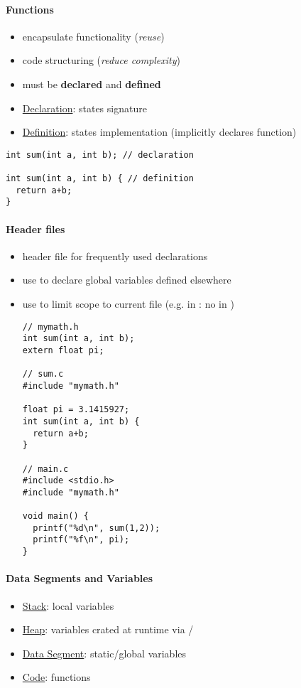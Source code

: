 \paragraph{Functions}
\begin{itemize}
  \item encapsulate functionality (\emph{reuse})
  \item code structuring (\emph{reduce complexity})
  \item must be \textbf{declared} and \textbf{defined}
  \item \underline{Declaration}: states signature
  \item \underline{Definition}: states implementation (implicitly declares function)
\end{itemize}
\begin{lstlisting}[style=customc]
int sum(int a, int b); // declaration

int sum(int a, int b) { // definition
  return a+b;
}
\end{lstlisting}

\paragraph{Header files}
\begin{itemize}
  \item header file for frequently used declarations
  \item use  to declare global variables defined elsewhere
  \item use  to limit scope to current file (e.g.  in : no  in )
  \begin{lstlisting}[style=customc]
// mymath.h
int sum(int a, int b);
extern float pi;

// sum.c
#include "mymath.h"

float pi = 3.1415927;
int sum(int a, int b) {
  return a+b;
}

// main.c
#include <stdio.h>
#include "mymath.h"

void main() {
  printf("%d\n", sum(1,2));
  printf("%f\n", pi);
}
  \end{lstlisting}
\end{itemize}

\paragraph{Data Segments and Variables}
\begin{itemize}
  \item \underline{Stack}: local variables
  \item \underline{Heap}: variables crated at runtime via /
  \item \underline{Data Segment}: static/global variables
  \item \underline{Code}: functions
\end{itemize}

